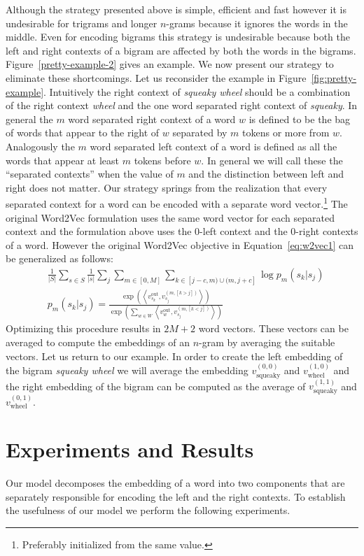 \documentclass{article}
\newcommand{\figref}[1]{Figure~\ref{#1}}
\renewcommand{\eqref}[1]{Equation~\ref{#1}}
\newcommand{\vo}[1]{v^{\textrm{out}}_{#1}}
\newcommand{\ip}[2]{\left\langle#1, #2\right\rangle}
\newcommand{\wv}{Word2Vec\xspace}
\begin{document}
Although the strategy presented above is simple, efficient and fast however it
is undesirable for trigrams and longer $n$-grams because it ignores the words in
the middle. Even for encoding bigrams this strategy is undesirable because
both the left and right contexts of a bigram are affected by both the words in the
bigrams. \figref{pretty-example-2} gives an example.
We now present our strategy to eliminate these shortcomings. Let us reconsider
the example in \figref{fig:pretty-example}. Intuitively the right context of
\textit{squeaky wheel} should be a combination of the right context
\textit{wheel} and the one word separated right context of \textit{squeaky}.
In general the $m$ word separated right context of a word $w$ is defined to be
the bag of words that appear to the right of $w$ separated by $m$ tokens or more
from $w$. Analogously the $m$ word separated left context of a word is defined
as all the words that appear at least $m$ tokens before $w$. In general we will
call these the ``{separated contexts}'' when the value of $m$ and the
distinction between left and right does not matter. Our strategy
springs from the realization that every separated context for a word can be
encoded with a separate word vector.\footnote{Preferably initialized from the
  same value.} The original \wv formulation uses the same word vector for each
separated context and the formulation above uses the $0$-left context and the
$0$-right contexts of a word. However the original \wv objective in
\eqref{eq:w2vec1} can be generalized as follows:
\begin{align}\label{eq:general}
  &\frac{1}{|S|} \sum_{s \in S} \frac{1}{|s|} \sum_{j} \sum_{m \in [0, M]} \sum_{k \in [j-c,m) \cup (m,j+c]} \log p_m(s_k | s_j)\\
  &p_m(s_k | s_j) = \frac{\exp\left(\ip{\vo{s_k}}{v_{s_j}^{(m,[k>j])}}\right)}{\exp\left(\sum_{w \in W}\ip{\vo{w}}{v_{s_j}^{(m,[k<j])}}\right)}
\end{align}
Optimizing this procedure results in $2M+2$ word vectors. These vectors can be
averaged to compute the embeddings of an $n$-gram by averaging the suitable
vectors. Let us return to our example. In order to create the left embedding of the
bigram \textit{squeaky wheel} we will average the embedding
$v_{\textrm{squeaky}}^{(0,0)}$ and $v_{\textrm{wheel}}^{(1,0)}$ and the right embedding of the
bigram can be computed as the average of
$v_{\textrm{squeaky}}^{(1,1)}$ and $v_{\textrm{wheel}}^{(0,1)}$.

\section{Experiments and Results}
\label{sec:experiments-results}
Our model decomposes the embedding of a word into two components that are
separately responsible for encoding the left and the right contexts. To
establish the usefulness of our model we perform the following experiments.
\end{document}
